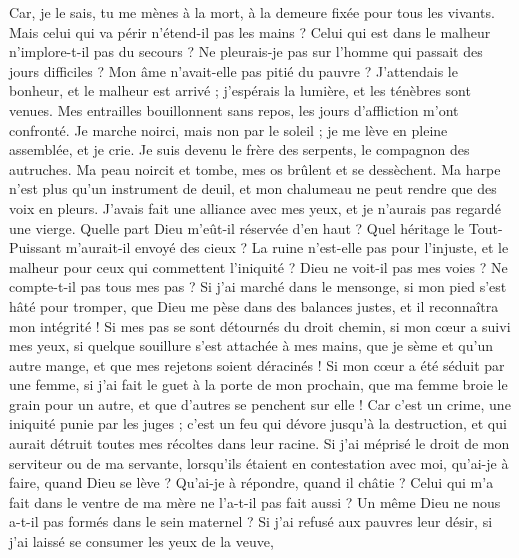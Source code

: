 \begin{multicols}{2}
Car, je le sais, tu me mènes à la mort, à la demeure fixée pour tous les vivants.
Mais celui qui va périr n'étend-il pas les mains ? Celui qui est dans le malheur n'implore-t-il pas du secours ?
Ne pleurais-je pas sur l'homme qui passait des jours difficiles ? Mon âme n'avait-elle pas pitié du pauvre ?
J'attendais le bonheur, et le malheur est arrivé ; j'espérais la lumière, et les ténèbres sont venues.
Mes entrailles bouillonnent sans repos, les jours d'affliction m'ont confronté.
Je marche noirci, mais non par le soleil ; je me lève en pleine assemblée, et je crie.
Je suis devenu le frère des serpents, le compagnon des autruches.
Ma peau noircit et tombe, mes os brûlent et se dessèchent.
Ma harpe n'est plus qu'un instrument de deuil, et mon chalumeau ne peut rendre que des voix en pleurs.
\VerseOne{}J'avais fait une alliance avec mes yeux, et je n'aurais pas regardé une vierge.
Quelle part Dieu m'eût-il réservée d'en haut ? Quel héritage le Tout-Puissant m'aurait-il envoyé des cieux ?
La ruine n'est-elle pas pour l'injuste, et le malheur pour ceux qui commettent l'iniquité ?
Dieu ne voit-il pas mes voies ? Ne compte-t-il pas tous mes pas ?
Si j'ai marché dans le mensonge, si mon pied s'est hâté pour tromper,
que Dieu me pèse dans des balances justes, et il reconnaîtra mon intégrité !
Si mes pas se sont détournés du droit chemin, si mon cœur a suivi mes yeux, si quelque souillure s'est attachée à mes mains,
que je sème et qu'un autre mange, et que mes rejetons soient déracinés !
Si mon cœur a été séduit par une femme, si j'ai fait le guet à la porte de mon prochain,
que ma femme broie le grain pour un autre, et que d'autres se penchent sur elle !
Car c'est un crime, une iniquité punie par les juges ;
c'est un feu qui dévore jusqu'à la destruction, et qui aurait détruit toutes mes récoltes dans leur racine.
Si j'ai méprisé le droit de mon serviteur ou de ma servante, lorsqu'ils étaient en contestation avec moi,
qu'ai-je à faire, quand Dieu se lève ? Qu'ai-je à répondre, quand il châtie ?
Celui qui m'a fait dans le ventre de ma mère ne l'a-t-il pas fait aussi ? Un même Dieu ne nous a-t-il pas formés dans le sein maternel ?
Si j'ai refusé aux pauvres leur désir, si j'ai laissé se consumer les yeux de la veuve,

\end{multicols}
